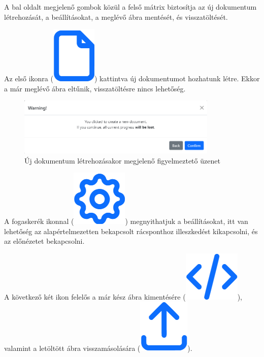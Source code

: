 
A bal oldalt megjelenő gombok közül a felső mátrix biztosítja az új dokumentum létrehozását, a beállításokat, a meglévő ábra mentését, és visszatöltését.

Az első ikonra 
(\includegraphics[height=\fontcharht\font`\B]{images/new.png})
kattintva új dokumentumot hozhatunk létre. Ekkor a már meglévő ábra eltűnik, visszatöltésre nincs lehetőség.

\begin{figure}[!h]
	\label{fig:new}
	\centering
	\includegraphics[width=0.85\textwidth]{images/new_modal.png}
	\caption{Új dokumentum létrehozásakor megjelenő figyelmeztető üzenet}
\end{figure}

A fogaskerék ikonnal 
(\includegraphics[height=\fontcharht\font`\B]{images/settings.png})
megnyithatjuk a beállításokat, itt van lehetőség az alapértelmezetten bekapcsolt rácsponthoz illeszkedést kikapcsolni, és az előnézetet bekapcsolni.

A következő két ikon felelős a már kész ábra kimentésére 
(\includegraphics[height=\fontcharht\font`\B]{images/save.png}),
valamint a letöltött ábra visszamásolására
(\includegraphics[height=\fontcharht\font`\B]{images/load.png}).

